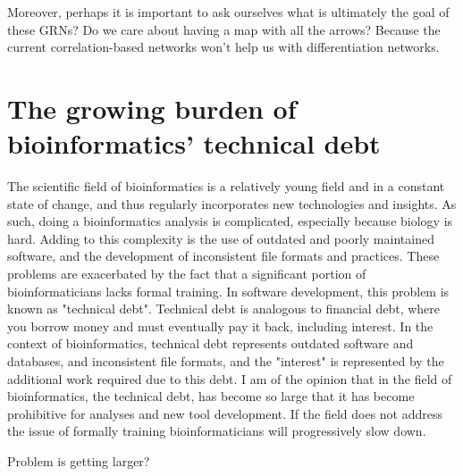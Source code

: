 Moreover, perhaps it is important to ask ourselves what is ultimately the goal of these GRNs? Do we care about having a map with all the arrows? Because the current correlation-based networks won't help us with differentiation networks. 

\section{The growing burden of bioinformatics' technical debt}

\cite{Williams2019}

The scientific field of bioinformatics is a relatively young field and in a constant state of change, and thus regularly incorporates new technologies and insights. As such, doing a bioinformatics analysis is complicated, especially because biology is hard. Adding to this complexity is the use of outdated and poorly maintained software, and the development of inconsistent file formats and practices. These problems are exacerbated by the fact that a significant portion of bioinformaticians lacks formal training. In software development, this problem is known as "technical debt". Technical debt is analogous to financial debt, where you borrow money and must eventually pay it back, including interest. In the context of bioinformatics, technical debt represents outdated software and databases, and inconsistent file formats, and the "interest" is represented by the additional work required due to this debt. I am of the opinion that in the field of bioinformatics, the technical debt, has become so large that it has become prohibitive for analyses and new tool development. If the field does not address the issue of formally training bioinformaticians will progressively slow down.

Problem is getting larger?

